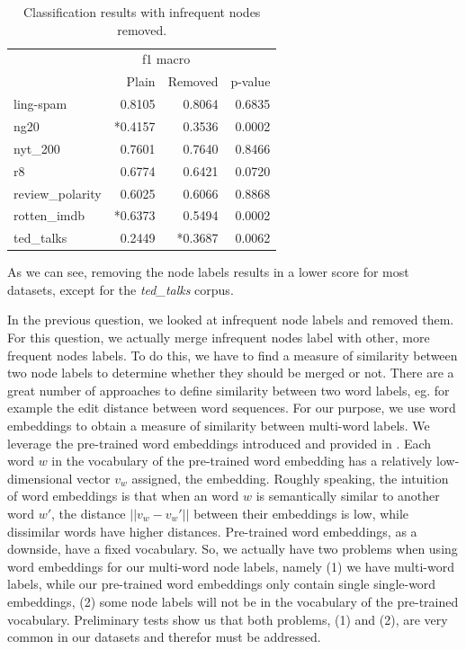 \begin{table}[htb!]
	\centering
	\begin{tabular}{lrrr}
		&  \multicolumn{2}{c}{f1 macro} &  \\
		 &  Plain &  Removed &  p-value \\
		\midrule
			ling-spam       & 0.8105 & 0.8064 & 0.6835 \\
			ng20            & *0.4157 & 0.3536 & 0.0002 \\
			nyt\_200         & 0.7601 & 0.7640 & 0.8466 \\
			r8              & 0.6774 & 0.6421 & 0.0720 \\
			review\_polarity & 0.6025 & 0.6066 & 0.8868 \\
			rotten\_imdb     & *0.6373 & 0.5494 & 0.0002 \\
			ted\_talks       & 0.2449 & *0.3687 & 0.0062 \\
		\bottomrule
	\end{tabular}
	\caption[Results: Remove infrequent node labels]{Classification results with infrequent nodes removed.}\label{table:results_infrequent_nodes}
\end{table}

As we can see, removing the node labels results in a lower score for most datasets, except for the \textit{ted\_talks} corpus.


In the previous question, we looked at infrequent node labels and removed them.
For this question, we actually merge infrequent nodes label with other, more frequent nodes labels.
To do this, we have to find a measure of similarity between two node labels to determine whether they should be merged or not.
There are a great number of approaches to define similarity between two word labels, eg. for example the edit distance between word sequences.
For our purpose, we use word embeddings \cite{Mikolov2013,Pennington,Goldberg2014} to obtain a measure of similarity between multi-word labels.
We leverage the pre-trained word embeddings introduced and provided in \cite{Pennington}.
Each word $w$ in the vocabulary of the pre-trained word embedding has a relatively low-dimensional vector $v_w$ assigned, the embedding.
Roughly speaking, the intuition of word embeddings is that when an word $w$ is semantically similar to another word $w'$, the distance $|| v_w - v_w' ||$ between their embeddings is low, while dissimilar words have higher distances.
Pre-trained word embeddings, as a downside, have a fixed vocabulary.
So, we actually have two problems when using word embeddings for our multi-word node labels, namely (1) we have multi-word labels, while our pre-trained word embeddings only contain single single-word embeddings, (2) some node labels will not be in the vocabulary of the pre-trained vocabulary.
Preliminary tests show us that both problems, (1) and (2), are very common in our datasets and therefor must be addressed.

